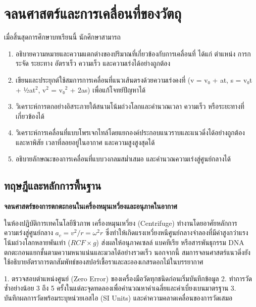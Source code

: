 \chapter{จลนศาสตร์และการเคลื่อนที่ของวัตถุ}
\label{ch:ch03_kinematics}

\begin{conceptbox}[title=วัตถุประสงค์การเรียนรู้ประจำบท]
เมื่อสิ้นสุดการศึกษาบทเรียนนี้ นักศึกษาสามารถ
\begin{enumerate}
    \item อธิบายความหมายและความแตกต่างของปริมาณที่เกี่ยวข้องกับการเคลื่อนที่ ได้แก่ ตำแหน่ง การกระจัด ระยะทาง อัตราเร็ว ความเร็ว และความเร่งได้อย่างถูกต้อง
    \item เขียนและประยุกต์ใช้สมการการเคลื่อนที่แนวเส้นตรงด้วยความเร่งคงที่ (v = v₀ + at, s = v₀t + ½at$^2$, v$^2$ = v₀$^2$ + 2as) เพื่อแก้โจทย์ปัญหาได้
    \item วิเคราะห์การตกอย่างอิสระภายใต้สนามโน้มถ่วงโลกและคำนวณเวลา ความเร็ว หรือระยะทางที่เกี่ยวข้องได้
    \item วิเคราะห์การเคลื่อนที่แบบโพรเจกไทล์โดยแยกองค์ประกอบแนวราบและแนวดิ่งได้อย่างถูกต้อง และหาพิสัย เวลาที่ลอยอยู่ในอากาศ และความสูงสูงสุดได้
    \item อธิบายลักษณะของการเคลื่อนที่แบบวงกลมสม่ำเสมอ และคำนวณความเร่งสู่ศูนย์กลางได้
\end{enumerate}
\end{conceptbox}

\section{ทฤษฎีและหลักการพื้นฐาน}

\begin{bioappbox}
\textbf{จลนศาสตร์ของการตกตะกอนในเครื่องหมุนเหวี่ยงและอนุภาคในอากาศ}

ในห้องปฏิบัติการเทคโนโลยีชีวภาพ เครื่องหมุนเหวี่ยง (Centrifuge) ทำงานโดยอาศัยหลักการความเร่งสู่ศูนย์กลาง $a_c = v^2/r = \omega^2 r$ ซึ่งทำให้เกิดแรงเหวี่ยงหนีศูนย์กลางจำลองที่มีค่าสูงกว่าแรงโน้มถ่วงโลกหลายพันเท่า ($RCF \times g$) ส่งผลให้อนุภาคเซลล์ แบคทีเรีย หรือสารพันธุกรรม DNA ตกตะกอนแยกชั้นตามความหนาแน่นและมวลได้อย่างรวดเร็ว นอกจากนี้ สมการจลนศาสตร์แนวดิ่งยังใช้อธิบายอัตราการตกสัมพัทธ์ของสปอร์เชื้อราและละอองเกสรดอกไม้ในบรรยากาศ
\end{bioappbox}

\begin{labbox}
1. ตรวจสอบตำแหน่งศูนย์ (Zero Error) ของเครื่องมือวัดทุกชนิดก่อนเริ่มบันทึกข้อมูล
2. ทำการวัดซ้ำอย่างน้อย 3 ถึง 5 ครั้งในแต่ละจุดทดลองเพื่อคำนวณหาค่าเฉลี่ยและค่าเบี่ยงเบนมาตรฐาน
3. บันทึกผลการวัดพร้อมระบุหน่วยเอสไอ (SI Units) และค่าความคลาดเคลื่อนของการวัดเสมอ
\end{labbox}


